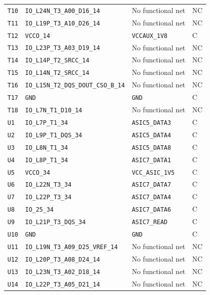 \documentclass[10pt,a4paper]{article}
\begin{document}
\begin{longtable}{@{}P{15mm}P{42mm}P{92mm}P{10mm}@{}}
\nolinkurl{T10} & \nolinkurl{IO_L24N_T3_A00_D16_14} & No functional net & NC \\
\nolinkurl{T11} & \nolinkurl{IO_L19P_T3_A10_D26_14} & No functional net & NC \\
\nolinkurl{T12} & \nolinkurl{VCCO_14} & \nolinkurl{VCCAUX_1V8} & C \\
\nolinkurl{T13} & \nolinkurl{IO_L23P_T3_A03_D19_14} & No functional net & NC \\
\nolinkurl{T14} & \nolinkurl{IO_L14P_T2_SRCC_14} & No functional net & NC \\
\nolinkurl{T15} & \nolinkurl{IO_L14N_T2_SRCC_14} & No functional net & NC \\
\nolinkurl{T16} & \nolinkurl{IO_L15N_T2_DQS_DOUT_CSO_B_14} & No functional net & NC \\
\nolinkurl{T17} & \nolinkurl{GND} & \nolinkurl{GND} & C \\
\nolinkurl{T18} & \nolinkurl{IO_L7N_T1_D10_14} & No functional net & NC \\
\nolinkurl{U1} & \nolinkurl{IO_L7P_T1_34} & \nolinkurl{ASIC5_DATA3} & C \\
\nolinkurl{U2} & \nolinkurl{IO_L9P_T1_DQS_34} & \nolinkurl{ASIC5_DATA4} & C \\
\nolinkurl{U3} & \nolinkurl{IO_L8N_T1_34} & \nolinkurl{ASIC5_DATA8} & C \\
\nolinkurl{U4} & \nolinkurl{IO_L8P_T1_34} & \nolinkurl{ASIC7_DATA1} & C \\
\nolinkurl{U5} & \nolinkurl{VCCO_34} & \nolinkurl{VCC_ASIC_1V5} & C \\
\nolinkurl{U6} & \nolinkurl{IO_L22N_T3_34} & \nolinkurl{ASIC7_DATA7} & C \\
\nolinkurl{U7} & \nolinkurl{IO_L22P_T3_34} & \nolinkurl{ASIC7_DATA4} & C \\
\nolinkurl{U8} & \nolinkurl{IO_25_34} & \nolinkurl{ASIC7_DATA6} & C \\
\nolinkurl{U9} & \nolinkurl{IO_L21P_T3_DQS_34} & \nolinkurl{ASIC7_READ} & C \\
\nolinkurl{U10} & \nolinkurl{GND} & \nolinkurl{GND} & C \\
\nolinkurl{U11} & \nolinkurl{IO_L19N_T3_A09_D25_VREF_14} & No functional net & NC \\
\nolinkurl{U12} & \nolinkurl{IO_L20P_T3_A08_D24_14} & No functional net & NC \\
\nolinkurl{U13} & \nolinkurl{IO_L23N_T3_A02_D18_14} & No functional net & NC \\
\nolinkurl{U14} & \nolinkurl{IO_L22P_T3_A05_D21_14} & No functional net & NC \\

\end{longtable}
\end{document}
